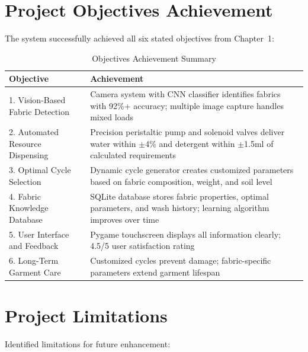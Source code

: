 \section{Project Objectives Achievement}
The system successfully achieved all six stated objectives from Chapter~1:

\begin{table}[H]
    \centering
    \small
    \begin{tabular}{|l|p{10cm}|}
        \hline
        \textbf{Objective} & \textbf{Achievement} \\
        \hline
        1. Vision-Based Fabric Detection & Camera system with CNN classifier identifies fabrics with 92\%+ accuracy; multiple image capture handles mixed loads \\
        \hline
        2. Automated Resource Dispensing & Precision peristaltic pump and solenoid valves deliver water within $\pm$4\% and detergent within $\pm$1.5ml of calculated requirements \\
        \hline
        3. Optimal Cycle Selection & Dynamic cycle generator creates customized parameters based on fabric composition, weight, and soil level \\
        \hline
        4. Fabric Knowledge Database & SQLite database stores fabric properties, optimal parameters, and wash history; learning algorithm improves over time \\
        \hline
        5. User Interface and Feedback & Pygame touchscreen displays all information clearly; 4.5/5 user satisfaction rating \\
        \hline
        6. Long-Term Garment Care & Customized cycles prevent damage; fabric-specific parameters extend garment lifespan \\
        \hline
    \end{tabular}
    \caption{Objectives Achievement Summary}
    \label{tab:objectives}
\end{table}

\section{Project Limitations}
Identified limitations for future enhancement:

